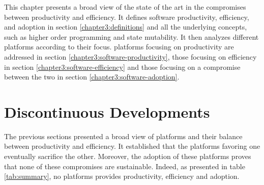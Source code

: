 This chapter presents a broad view of the state of the art in the compromises between productivity and efficiency.
It defines software productivity, efficiency, and adoption in section \ref{chapter3:definitions} and all the underlying concepts, such as higher order programming and state mutability.
It then analyzes different platforms according to their focus. platforms focusing on productivity are addressed in section \ref{chapter3:software-productivity}, those focusing on efficiency in section \ref{chapter3:software-efficiency} and those focusing on a compromise between the two in section \ref{chapter3:software-adoption}.







\section{Discontinuous Developments}

The previous sections presented a broad view of platforms and their balance between productivity and efficiency.
It established that the platforms favoring one eventually sacrifice the other.
Moreover, the adoption of these platforms proves that none of these compromises are sustainable.
Indeed, as presented in table \ref{tab:summary}, no platforms provides productivity, efficiency and adoption.


\separator


